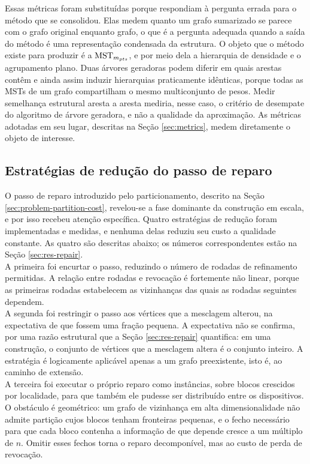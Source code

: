 Essas métricas foram substituídas porque respondiam à pergunta errada para o método que se consolidou. Elas medem quanto um grafo sumarizado se parece com o grafo original enquanto grafo, o que é a pergunta adequada quando a saída do método é uma representação condensada da estrutura. O objeto que o método existe para produzir é a $\mathrm{MST}_{m_{pts}}$, e por meio dela a hierarquia de densidade e o agrupamento plano. Duas árvores geradoras podem diferir em quais arestas contêm e ainda assim induzir hierarquias praticamente idênticas, porque todas as \ac{MST}s de um grafo compartilham o mesmo multiconjunto de pesos. Medir semelhança estrutural aresta a aresta mediria, nesse caso, o critério de desempate do algoritmo de árvore geradora, e não a qualidade da aproximação. As métricas adotadas em seu lugar, descritas na Seção \ref{sec:metrics}, medem diretamente o objeto de interesse.\\

\subsection{Estratégias de redução do passo de reparo\label{sec:discarded-repair}}

O passo de reparo introduzido pelo particionamento, descrito na Seção \ref{sec:problem-partition-cost}, revelou-se a fase dominante da construção em escala, e por isso recebeu atenção específica. Quatro estratégias de redução foram implementadas e medidas, e nenhuma delas reduziu seu custo a qualidade constante. As quatro são descritas abaixo; os números correspondentes estão na Seção \ref{sec:res-repair}.\\

A primeira foi encurtar o passo, reduzindo o número de rodadas de refinamento permitidas. A relação entre rodadas e revocação é fortemente não linear, porque as primeiras rodadas estabelecem as vizinhanças das quais as rodadas seguintes dependem.\\

A segunda foi restringir o passo aos vértices que a mesclagem alterou, na expectativa de que fossem uma fração pequena. A expectativa não se confirma, por uma razão estrutural que a Seção \ref{sec:res-repair} quantifica: em uma construção, o conjunto de vértices que a mesclagem altera é o conjunto inteiro. A estratégia é logicamente aplicável apenas a um grafo preexistente, isto é, ao caminho de extensão.\\

A terceira foi executar o próprio reparo como instâncias, sobre blocos crescidos por localidade, para que também ele pudesse ser distribuído entre os dispositivos. O obstáculo é geométrico: um grafo de vizinhança em alta dimensionalidade não admite partição cujos blocos tenham fronteiras pequenas, e o fecho necessário para que cada bloco contenha a informação de que depende cresce a um múltiplo de $n$. Omitir esses fechos torna o reparo decomponível, mas ao custo de perda de revocação.\\

